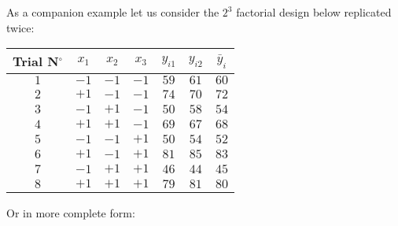 	As a companion example let us consider the $2^3$ factorial design below replicated twice:
	\begin{table}[H]\centering
	\begin{center}
			\begin{tabular}{|c|c|c|c|c|c|c|}
				\hline
				\multicolumn{1}{c}{\cellcolor{black!30}\textbf{Trial N${}^\circ$}} & 
  \multicolumn{1}{c}{\cellcolor{black!30}$x_1$} & 
  \multicolumn{1}{c}{\cellcolor{black!30}$x_2$} & 
  \multicolumn{1}{c}{\cellcolor{black!30}$x_3$} & 
  \multicolumn{1}{c}{\cellcolor{black!30}$y_{i1}$} & 
  \multicolumn{1}{c}{\cellcolor{black!30}$y_{i2}$} & 
  \multicolumn{1}{c}{\cellcolor{black!30}$\bar{y}_i$}\\ \hline
				 $1$ & $-1$ & $-1$ & $-1$ & $59$ & $61$ & $60$\\ \hline
				 $2$ & $+1$ & $-1$ & $-1$ & $74$ & $70$ & $72$\\ \hline
				 $3$ & $-1$ & $+1$ & $-1$ & $50$ & $58$ & $54$\\ \hline
				 $4$ & $+1$ & $+1$ & $-1$ & $69$ & $67$ & $68$\\ \hline
				 $5$ & $-1$ & $-1$ & $+1$ & $50$ & $54$ & $52$\\ \hline
				 $6$ & $+1$ & $-1$ & $+1$ & $81$ & $85$ & $83$\\ \hline
				 $7$ & $-1$ & $+1$ & $+1$ & $46$ & $44$ & $45$\\ \hline
				 $8$ & $+1$ & $+1$ & $+1$ & $79$ & $81$ & $80$\\ \hline
		\end{tabular}
	\end{center}
	\end{table}
	Or in more complete form:
